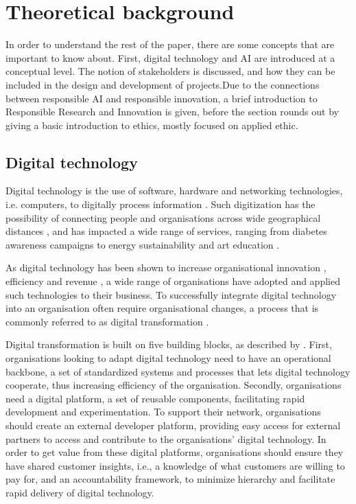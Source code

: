 \section{Theoretical background}
\label{sec:background}
In order to understand the rest of the paper, there are some concepts that are important to know about. First, digital technology and AI are introduced at a conceptual level. The notion of stakeholders is discussed, and how they can be included in the design and development of projects.Due to the connections between responsible AI and responsible innovation, a brief introduction to Responsible Research and Innovation is given, before the section rounds out by giving a basic introduction to ethics, mostly focused on applied ethic.

\subsection{Digital technology}
Digital technology is the use of software, hardware and networking technologies, i.e. computers, to digitally process information \parencite{Weisha_2021_digtech}. Such digitization has the possibility of connecting people and organisations across wide geographical distances \parencite{Forman_2019_digtech}, and has impacted a wide range of services, ranging from diabetes awareness campaigns \parencite{OMara_2012_digtech} to energy sustainability \parencite{Wang_2022_digtech} and art education \parencite{Wang_2020_digtech}. 

As digital technology has been shown to increase organisational innovation \parencite{Weisha_2021_digtech}, efficiency \parencite{Grober_2020_digtech} and revenue \parencite{Mohapatra_2022_digtech}, a wide range of organisations have adopted and applied such technologies to their business. To successfully integrate digital technology into an organisation often require organisational changes, a process that is commonly
referred to as digital transformation \parencite{Kretschmer_2020_digtech}. 

Digital transformation is built on five building blocks, as described by \textcite{ross_2018_digtech}. First, organisations looking to adapt digital technology need to have an operational backbone, a set of standardized systems and processes that lets digital technology cooperate, thus increasing efficiency of the organisation. Secondly, organisations need a digital platform, a set of reusable components, facilitating rapid development and experimentation. To support their network, organisations should create an external developer platform, providing easy access for external partners to access and contribute to the organisations' digital technology. In order to get value from these digital platforms, organisations should ensure they have shared customer insights, i.e., a knowledge of what customers are willing to pay for, and an accountability framework, to minimize hierarchy and facilitate rapid delivery of digital technology.

